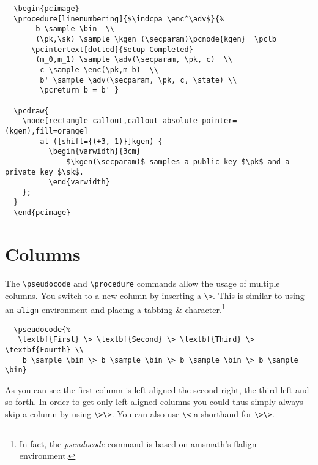 \documentclass[a4paper]{report}
\begin{document}
  \begin{lstlisting}
  \begin{pcimage}
  \procedure[linenumbering]{$\indcpa_\enc^\adv$}{%
	   b \sample \bin  \\
	   (\pk,\sk) \sample \kgen (\secparam)\pcnode{kgen}  \pclb
	  \pcintertext[dotted]{Setup Completed} 
	   (m_0,m_1) \sample \adv(\secparam, \pk, c)  \\
		c \sample \enc(\pk,m_b)  \\
		b' \sample \adv(\secparam, \pk, c, \state) \\
		\pcreturn b = b' }
  
  \pcdraw{
	\node[rectangle callout,callout absolute pointer=(kgen),fill=orange]
		at ([shift={(+3,-1)}]kgen) {
		  \begin{varwidth}{3cm}
			  $\kgen(\secparam)$ samples a public key $\pk$ and a private key $\sk$.
		  \end{varwidth}
	};
  }
  \end{pcimage}
  \end{lstlisting}
  
  
  
  \section{Columns}
  The \lstinline$\pseudocode$ and \lstinline$\procedure$ commands allow the usage of multiple columns.
  You switch to a new column by inserting a \lstinline$\>$. This is similar to using an \lstinline$align$
  environment and placing a tabbing \& character.\footnote{In fact, the \emph{pseudocode} command
  is based on amsmath's flalign environment.}
  \begin{center}
  \end{center}
  \begin{lstlisting}
  \pseudocode{%
   \textbf{First} \> \textbf{Second} \> \textbf{Third} \> \textbf{Fourth} \\
	b \sample \bin \> b \sample \bin \> b \sample \bin \> b \sample \bin}
  \end{lstlisting}
  As you can see the first column is left aligned the second right, the third left and so forth.
  In order to get only left aligned columns you could thus simply always skip a column by
  using \lstinline$\>\>$. You can also use \lstinline$\<$ a shorthand for \lstinline$\>\>$.
  \begin{center}
  \end{center}
  
\end{document}
